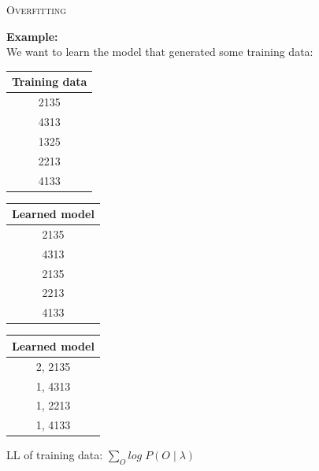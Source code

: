 
\begin{frame}
\center \huge \scshape Overfitting
\end{frame}

\begin{frame}
\center
\textbf{Example:}
\\
We want to learn the model that generated some training data:\\
\begin{table}[h]
\begin{tabular}{c}
\multicolumn{1}{l}{\textbf{Training data}} \\ \hline
\multicolumn{1}{|c|}{2135}    \\ \hline
\multicolumn{1}{|c|}{4313}    \\ \hline
\multicolumn{1}{|c|}{1325}    \\ \hline
\multicolumn{1}{|c|}{2213}    \\ \hline
\multicolumn{1}{|c|}{4133}    \\ \hline
\end{tabular}
\end{table}
\end{frame}

\begin{frame}
\begin{table}[h]
\begin{tabular}{c}
\multicolumn{1}{l}{\textbf{Learned model}} \\ \hline
\multicolumn{1}{|c|}{2135}    \\ \hline
\multicolumn{1}{|c|}{4313}    \\ \hline
\multicolumn{1}{|c|}{2135}    \\ \hline
\multicolumn{1}{|c|}{2213}    \\ \hline
\multicolumn{1}{|c|}{4133}    \\ \hline
\end{tabular}
\end{table}
\end{frame}

\begin{frame}
\begin{table}[h]
\begin{tabular}{c}
\multicolumn{1}{l}{\textbf{Learned model}} \\ \hline
\multicolumn{1}{|c|}{2, 2135}    \\ \hline
\multicolumn{1}{|c|}{1, 4313}    \\ \hline
\multicolumn{1}{|c|}{1, 2213}    \\ \hline
\multicolumn{1}{|c|}{1, 4133}    \\ \hline
\end{tabular}
\end{table}
\center
LL of training data: $\sum_O log \; P(O\;|\;\lambda)$
\end{frame}

